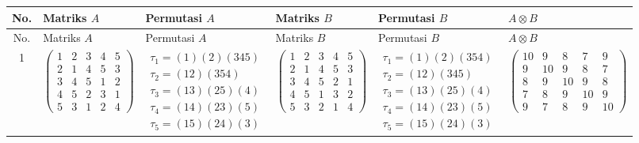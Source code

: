 \begingroup
\scriptsize
\setlength{\tabcolsep}{3pt}
\renewcommand{\arraystretch}{1.25}
\begin{longtable}{|c|p{2.7cm}|p{2.7cm}|p{2.7cm}|p{2.7cm}|p{3.3cm}|}
    \hline
    No.                                                                                                                                         & Matriks $A$ & Permutasi $A$ & Matriks $B$ & Permutasi $B$ & $A \otimes B$ \\
    \hline
    \endfirsthead
    \hline
    No.                                                                                                                                         & Matriks $A$ & Permutasi $A$ & Matriks $B$ & Permutasi $B$ & $A \otimes B$ \\
    \hline
    \endhead
    1                                                                                                                                           &
    $\begin{pmatrix}1&2&3&4&5\\2&1&4&5&3\\3&4&5&1&2\\4&5&2&3&1\\5&3&1&2&4\end{pmatrix}$                                                         &
    $\begin{array}{l}\tau_{1}=(1)(2)(345)\\ \tau_{2}=(12)(354)\\ \tau_{3}=(13)(25)(4)\\ \tau_{4}=(14)(23)(5)\\ \tau_{5}=(15)(24)(3)\end{array}$ &
    $\begin{pmatrix}1&2&3&4&5\\2&1&4&5&3\\3&4&5&2&1\\4&5&1&3&2\\5&3&2&1&4\end{pmatrix}$                                                         &
    $\begin{array}{l}\tau_{1}=(1)(2)(354)\\ \tau_{2}=(12)(345)\\ \tau_{3}=(13)(25)(4)\\ \tau_{4}=(14)(23)(5)\\ \tau_{5}=(15)(24)(3)\end{array}$ &
    $\begin{pmatrix}10&9&8&7&9\\9&10&9&8&7\\8&9&10&9&8\\7&8&9&10&9\\9&7&8&9&10\end{pmatrix}$                                                                                                                                \\

\end{longtable}
